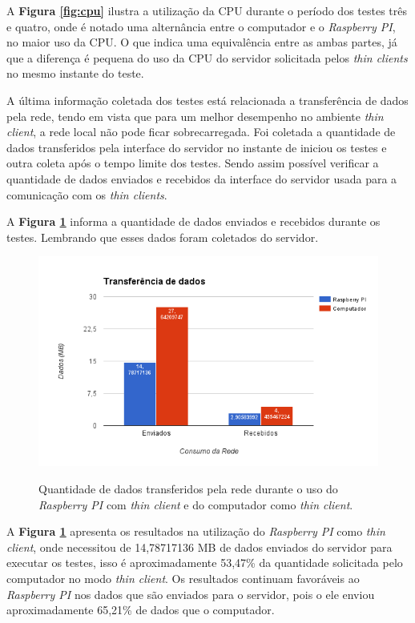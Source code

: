 \documentclass[
	12pt,				%
	openright,			%
	twoside,			%
	a4paper,			%
	chapter=TITLE,		%
	english,			%
	brazil				%
	]{abntex2}
\begin{document}
A \textbf{Figura \ref{fig:cpu}} ilustra a utilização da CPU durante o período dos testes três e quatro, onde é notado uma alternância entre o computador e o \textit{Raspberry PI}, no maior uso da CPU. O que indica uma equivalência entre as ambas partes, já que a diferença é pequena do uso da CPU do servidor solicitada pelos \textit{thin clients}  no mesmo instante do teste.

A última informação coletada dos testes está relacionada a transferência de dados pela rede, tendo em vista que para um melhor desempenho no ambiente \textit{thin client}, a rede local não pode ficar sobrecarregada. Foi coletada a quantidade de dados transferidos pela interface do servidor no instante de iniciou os testes e outra coleta após o tempo limite dos testes. Sendo assim possível verificar a quantidade de dados enviados e recebidos da interface do servidor usada para a comunicação com os \textit{thin clients}.

A \textbf{Figura \ref{fig:net}} informa a quantidade de dados enviados e recebidos durante os testes. Lembrando que esses dados foram coletados do servidor.

\begin{figure}[!h]
\centering
\caption{Quantidade de dados transferidos pela rede durante o uso do \textit{Raspberry PI} com \textit{thin client} e do computador como \textit{thin client}.}
\includegraphics[scale=0.8]{Imagens/net}
\label{fig:net}
\end{figure}

\newpage
A \textbf{Figura \ref{fig:net}} apresenta os resultados na utilização do \textit{Raspberry PI} como \textit{thin client}, onde necessitou de 14,78717136 MB de dados enviados do servidor para executar os testes, isso é aproximadamente 53,47\% da quantidade solicitada pelo computador no modo \textit{thin client}. Os resultados continuam favoráveis ao \textit{Raspberry PI} nos dados que são enviados para o servidor, pois o ele enviou aproximadamente 65,21\% de dados que o computador.
\end{document}
